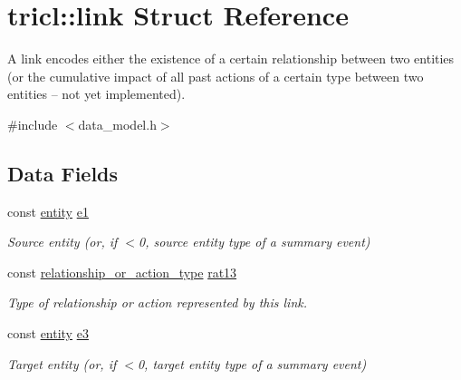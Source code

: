 \hypertarget{structtricl_1_1link}{}\section{tricl\+:\+:link Struct Reference}
\label{structtricl_1_1link}


A link encodes either the existence of a certain relationship between two entities (or the cumulative impact of all past actions of a certain type between two entities -- not yet implemented).  




{\ttfamily \#include $<$data\+\_\+model.\+h$>$}

\subsection*{Data Fields}
\begin{DoxyCompactItemize}
\item 
\mbox{\label{structtricl_1_1link_a94b71567d0a342c8d0bf28e4fea1dff4}} 
const \hyperlink{namespacetricl_a57273122278e8b301844e2a2e1f0742f}{entity} \hyperlink{structtricl_1_1link_a94b71567d0a342c8d0bf28e4fea1dff4}{e1}
\begin{DoxyCompactList}\small\item\em Source entity (or, if $<$0, source entity type of a summary event) \end{DoxyCompactList}\item 
\mbox{\label{structtricl_1_1link_a9a21745032378ca68f88966d78814be0}} 
const \hyperlink{namespacetricl_a2d01894944fb58a8fedc0912a48d13f8}{relationship\+\_\+or\+\_\+action\+\_\+type} \hyperlink{structtricl_1_1link_a9a21745032378ca68f88966d78814be0}{rat13}
\begin{DoxyCompactList}\small\item\em Type of relationship or action represented by this link. \end{DoxyCompactList}\item 
\mbox{\label{structtricl_1_1link_ad54f7dbfcda5fd3f98ff5db897893c87}} 
const \hyperlink{namespacetricl_a57273122278e8b301844e2a2e1f0742f}{entity} \hyperlink{structtricl_1_1link_ad54f7dbfcda5fd3f98ff5db897893c87}{e3}
\begin{DoxyCompactList}\small\item\em Target entity (or, if $<$0, target entity type of a summary event) \end{DoxyCompactList}\end{DoxyCompactItemize}
